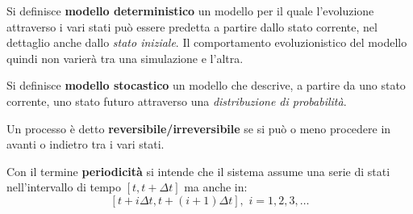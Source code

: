 \documentclass[a4paper,12pt, oneside]{book}
\begin{document}
\begin{definizione}
  Si definisce \textbf{modello deterministico} un modello per il quale
  l'evoluzione attraverso i vari stati può essere predetta a partire dallo stato
  corrente, nel dettaglio anche dallo \textit{stato iniziale}. Il comportamento
  evoluzionistico del modello quindi non varierà tra una simulazione e l'altra.
\end{definizione}
\begin{definizione}
  Si definisce \textbf{modello stocastico} un modello che descrive, a partire da
  uno stato corrente, uno stato futuro attraverso una \textit{distribuzione di
    probabilità}.
\end{definizione}
\begin{definizione}
  Un processo è detto \textbf{reversibile/irreversibile} se si può o meno
  procedere in avanti o indietro tra i vari stati.
\end{definizione}
\begin{definizione}
  Con il termine \textbf{periodicità} si intende che il sistema assume una serie
  di stati nell'intervallo di tempo $[t, t+\Delta t]$ ma anche in:
  \[[t+i \Delta t, t+(i+1)\Delta t],\,\,i=1,2,3,\ldots\]
\end{definizione}
\end{document}
